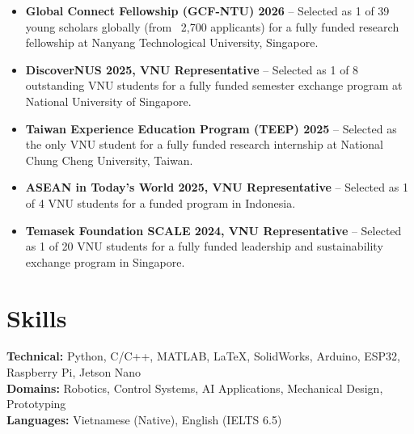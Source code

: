 \documentclass[a4paper,11pt]{article}
\begin{document}
\vspace{-2pt}
\begin{itemize}[nosep]
    
    \item \textbf{Global Connect Fellowship (GCF-NTU) 2026} -- Selected as 1 of 39 young scholars globally (from ~2,700 applicants) for a fully funded research fellowship at Nanyang Technological University, Singapore.
    
    \item \textbf{DiscoverNUS 2025, VNU Representative} -- Selected as 1 of 8 outstanding VNU students for a fully funded semester exchange program at National University of Singapore.
    
    \item \textbf{Taiwan Experience Education Program (TEEP) 2025} -- Selected as the only VNU student for a fully funded research internship at National Chung Cheng University, Taiwan.
    
    \item \textbf{ASEAN in Today’s World 2025, VNU Representative} -- Selected as 1 of 4 VNU students for a funded program in Indonesia.
    
    \item \textbf{Temasek Foundation SCALE 2024, VNU Representative} -- Selected as 1 of 20 VNU students for a fully funded leadership and sustainability exchange program in Singapore.
\end{itemize}

\vspace{-2pt}

\section{Skills}
\textbf{Technical:} Python, C/C++, MATLAB, \LaTeX, SolidWorks, Arduino, ESP32, Raspberry Pi, Jetson Nano\\
\textbf{Domains:} Robotics, Control Systems, AI Applications, Mechanical Design, Prototyping\\
\textbf{Languages:} Vietnamese (Native), English (IELTS 6.5)
\end{document}
